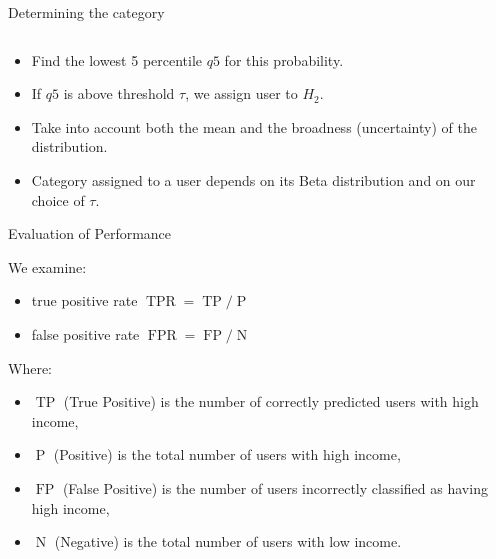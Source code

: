 \documentclass[usenames,dvipsnames]{beamer}
\newcommand{\TP}{\operatorname{TP}}
\newcommand{\FP}{\operatorname{FP}}
\newcommand{\TPR}{\operatorname{TPR}}
\newcommand{\FPR}{\operatorname{FPR}}
\begin{document}
\begin{frame}{Determining the category}
\begin{columns}
\begin{column}{0.49\textwidth}
\end{column}
\end{columns}


\begin{itemize}

\item Find the lowest 5 percentile $q5$ for this probability. 

\item If $q5$ is above threshold $\tau$, we assign user to $H_2$.

\item Take into account both the mean and the broadness (uncertainty) of the distribution. 

\item Category assigned to a user depends on its Beta distribution and on our choice of $\tau$.
\end{itemize}

\end{frame}


\begin{frame}{Evaluation of Performance}

We examine:
\begin{itemize}
\item true positive rate \( \TPR = \TP / \operatorname{P} \)
\item false positive rate \( \FPR = \FP / \operatorname{N} \)
\end{itemize}
Where:
\begin{itemize}
\item $\TP$ (True Positive) is the number of correctly predicted users with high income,
\item $\operatorname{P}$ (Positive) is the total number of users with high income, 
\item $\FP$ (False Positive) is the number of users incorrectly classified as having high income,
\item $\operatorname{N}$ (Negative) is the total number of users with low income.

\end{itemize} 


\end{frame}
\end{document}

